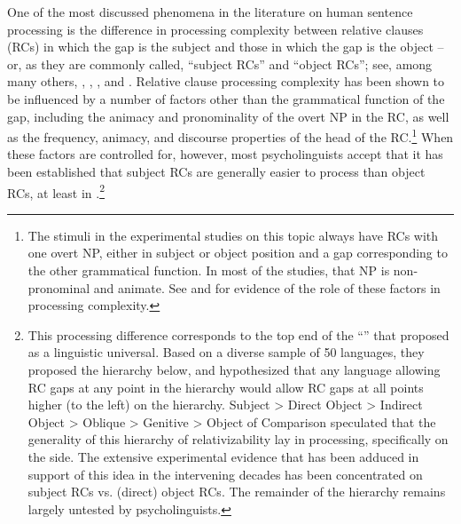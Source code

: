 \documentclass[output=paper
 	        ,biblatex
                ,babelshorthands
                ,newtxmath
                ,draftmode
                ,colorlinks, citecolor=brown
]{langscibook}
\begin{document}
One of the most discussed phenomena in the literature on human sentence processing is the difference
in processing complexity between relative clauses (RCs) in which the gap is the subject and those in which the gap is the object -- or, as they are commonly called, ``subject RCs'' and ``object RCs''; see, among many others, \citet{WannerMaratsos78}, \citet{Gibson98a}, \citet{TraxlerEtal2002}, and \citet{GennariMacDonald2008}.  Relative clause processing complexity has been shown to be influenced by a number of factors other than the grammatical function of the gap, including the animacy and pronominality of the overt NP in the RC, as well as the frequency, animacy, and discourse properties of the head of the RC.\footnote{The stimuli in the experimental studies on this topic always have RCs with one overt NP, either in subject or object position and a gap corresponding to the other grammatical function. In most of the studies, that NP is non-pronominal and animate.  See \citet{RealiChristiansen07} and \citet{RolandEtal2012} for evidence of the role of these factors in processing complexity.} When these factors are controlled for, however, most psycholinguists accept that it has been established that subject RCs are generally easier to process than object RCs, at least in .\footnote{This processing difference corresponds to the top end of the ``'' that \citet{KC77a} proposed as a linguistic universal. Based on a diverse sample of 50 languages, they proposed the hierarchy below, and hypothesized that any language allowing RC gaps at any point in the hierarchy would allow RC gaps at all points higher (to the left) on the hierarchy.
\ea
Subject 
> 
Direct Object 
> 
Indirect Object 
> 
Oblique 
> 
Genitive
> 
Object of Comparison
\z
\citeauthor{KC77a} speculated that the generality of this hierarchy of relativizability lay in processing, specifically on the  side.  The extensive experimental evidence that has been adduced in support of this idea in the intervening decades has been concentrated on subject RCs vs. (direct) object RCs.  The remainder of the hierarchy remains largely untested by psycholinguists.}
\end{document}
